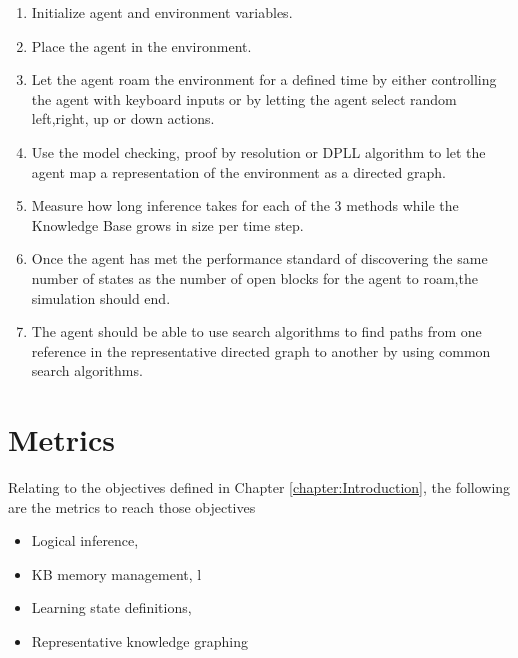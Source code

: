 \begin{enumerate}
	\item Initialize agent and environment variables.
	\item Place the agent in the environment.
	\item Let the agent roam the environment for a defined time by either controlling the agent with keyboard inputs or by letting the agent select random left,right, up or down actions.
	\item Use the model checking, proof by resolution or DPLL algorithm to let the agent map a representation of the environment as a directed graph.
	\item Measure how long inference takes for each of the 3 methods while the Knowledge Base grows in size per time step.
	\item Once the agent has met the performance standard of discovering the same number of states as the number of open blocks for the agent to roam,the simulation should end.
	\item The agent should be able to use search algorithms to find paths from one reference in the representative directed graph to another by using common search algorithms.
\end{enumerate}


\section{Metrics}
Relating to the objectives defined in Chapter \ref{chapter:Introduction}, the following are the metrics to reach those objectives

\begin{itemize}
 \item Logical inference, 
 \item KB memory management, l
 \item Learning state definitions, 
 \item Representative knowledge graphing 
\end{itemize}

